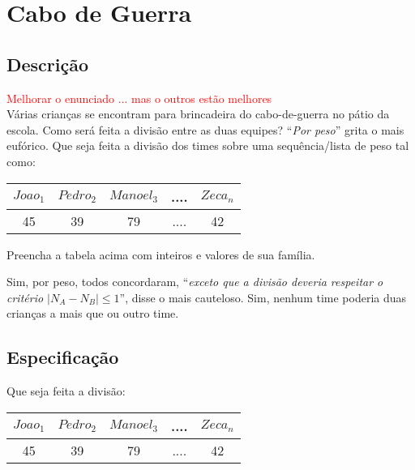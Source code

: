 \section{Cabo de Guerra}

\subsection{Descrição}

\textcolor{red}{Melhorar o enunciado ... mas o outros estão melhores}\\

Várias crianças se encontram para 
 brincadeira do cabo-de-guerra no pátio da escola. Como será
 feita a divisão entre as  duas equipes?   ``{\em Por peso}''\/ grita o mais eufórico. Que seja feita a divisão dos times  sobre uma sequência/lista de peso tal como:
 
\begin{center}
\begin{tabular}{|c|c|c|c|c|}
\hline
$Joao_1$ & $Pedro_2$ & $Manoel_3$ & .... & $Zeca_n$ \\ \hline
45 & 39 & 79 & .... & 42  \\ \hline
\end{tabular}
\end{center}

 Preencha a tabela acima com inteiros e valores de sua família.

  Sim, por peso, todos concordaram,
 ``{\em exceto que a divisão deveria respeitar o critério $|N_A - N_B| \le 1$}'', disse o 
mais cauteloso. Sim, nenhum time poderia duas crianças a mais que ou outro time. 

\subsection{Especificação}

Que seja feita a divisão:

 
\begin{center}
\begin{tabular}{|c|c|c|c|c|}
\hline
$Joao_1$ & $Pedro_2$ & $Manoel_3$ & .... & $Zeca_n$ \\ \hline
45 & 39 & 79 & .... & 42  \\ \hline
\end{tabular}
\end{center}

